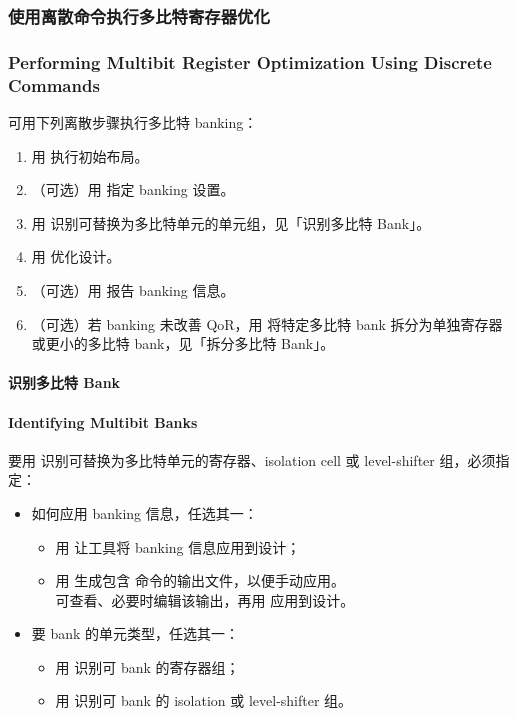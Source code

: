 \subsubsection{使用离散命令执行多比特寄存器优化}
\subsubsection*{Performing Multibit Register Optimization Using Discrete Commands}

可用下列离散步骤执行多比特 banking：
\begin{enumerate}
  \item 用  执行初始布局。
  \item （可选）用  指定 banking 设置。
  \item 用  识别可替换为多比特单元的单元组，见「识别多比特 Bank」。
  \item 用  优化设计。
  \item （可选）用  报告 banking 信息。
  \item （可选）若 banking 未改善 QoR，用  将特定多比特 bank 拆分为单独寄存器或更小的多比特 bank，见「拆分多比特 Bank」。
\end{enumerate}

\paragraph{识别多比特 Bank}
\paragraph*{Identifying Multibit Banks}

要用  识别可替换为多比特单元的寄存器、isolation cell 或 level-shifter 组，必须指定：
\begin{itemize}
  \item 如何应用 banking 信息，任选其一：
        \begin{itemize}
          \item 用  让工具将 banking 信息应用到设计；
          \item 用  生成包含  命令的输出文件，以便手动应用。\\
                可查看、必要时编辑该输出，再用  应用到设计。
        \end{itemize}
  \item 要 bank 的单元类型，任选其一：
        \begin{itemize}
          \item 用  识别可 bank 的寄存器组；
          \item 用  识别可 bank 的 isolation 或 level-shifter 组。
        \end{itemize}
\end{itemize}

